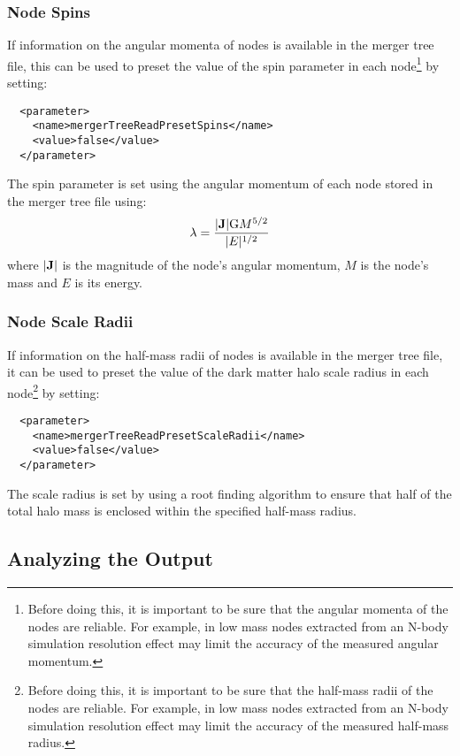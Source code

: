 \subsubsection{Node Spins}

If information on the angular momenta of nodes is available in the merger tree file, this can be used to preset the value of the spin parameter in each node\footnote{Before doing this, it is important to be sure that the angular momenta of the nodes are reliable. For example, in low mass nodes extracted from an N-body simulation resolution effect may limit the accuracy of the measured angular momentum.} by setting:

\begin{verbatim}
  <parameter>
    <name>mergerTreeReadPresetSpins</name>
    <value>false</value>
  </parameter>
\end{verbatim}

The spin parameter is set using the angular momentum of each node stored in the merger tree file using:
\begin{equation}
 \lambda = {|{\bf J}| {\rm G} M^{5/2} \over |E|^{1/2}}
\end{equation}
where $|{\bf J}|$ is the magnitude of the node's angular momentum, $M$ is the node's mass and $E$ is its energy.

\subsubsection{Node Scale Radii}

If information on the half-mass radii of nodes is available in the merger tree file, it can be used to preset the value of the dark matter halo scale radius in each node\footnote{Before doing this, it is important to be sure that the half-mass radii of the nodes are reliable. For example, in low mass nodes extracted from an N-body simulation resolution effect may limit the accuracy of the measured half-mass radius.} by setting:

\begin{verbatim}
  <parameter>
    <name>mergerTreeReadPresetScaleRadii</name>
    <value>false</value>
  </parameter>
\end{verbatim}

The scale radius is set by using a root finding algorithm to ensure that half of the total halo mass is enclosed within the specified half-mass radius.

\subsection{Analyzing the Output}

